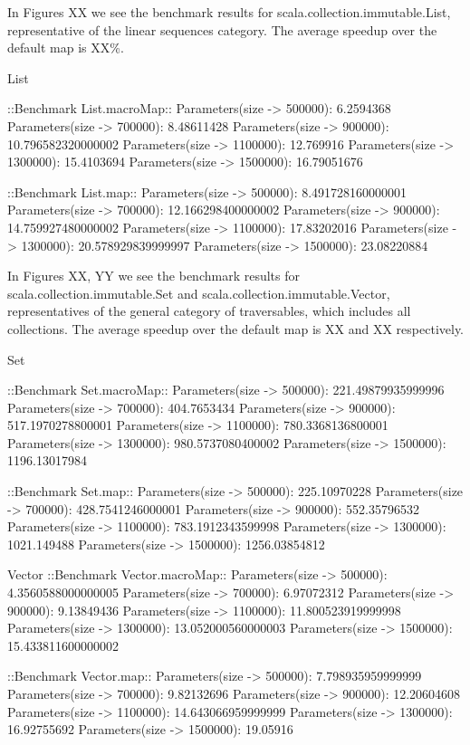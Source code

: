 In Figures XX we see the benchmark results for scala.collection.immutable.List,
representative of the linear sequences category. The average speedup over the
default map is XX\%.

List

::Benchmark List.macroMap::
Parameters(size -> 500000): 6.2594368
Parameters(size -> 700000): 8.48611428
Parameters(size -> 900000): 10.796582320000002
Parameters(size -> 1100000): 12.769916
Parameters(size -> 1300000): 15.4103694
Parameters(size -> 1500000): 16.79051676

::Benchmark List.map::
Parameters(size -> 500000): 8.491728160000001
Parameters(size -> 700000): 12.166298400000002
Parameters(size -> 900000): 14.759927480000002
Parameters(size -> 1100000): 17.83202016
Parameters(size -> 1300000): 20.578929839999997
Parameters(size -> 1500000): 23.08220884


In Figures XX, YY we see the benchmark results for
scala.collection.immutable.Set and scala.collection.immutable.Vector,
representatives of the general category of traversables, which includes all
collections. The average speedup over the default map is XX and XX respectively.

Set

::Benchmark Set.macroMap::
Parameters(size -> 500000): 221.49879935999996
Parameters(size -> 700000): 404.7653434
Parameters(size -> 900000): 517.1970278800001
Parameters(size -> 1100000): 780.3368136800001
Parameters(size -> 1300000): 980.5737080400002
Parameters(size -> 1500000): 1196.13017984

::Benchmark Set.map::
Parameters(size -> 500000): 225.10970228
Parameters(size -> 700000): 428.7541246000001
Parameters(size -> 900000): 552.35796532
Parameters(size -> 1100000): 783.1912343599998
Parameters(size -> 1300000): 1021.149488
Parameters(size -> 1500000): 1256.03854812


Vector
::Benchmark Vector.macroMap::
Parameters(size -> 500000): 4.3560588000000005
Parameters(size -> 700000): 6.97072312
Parameters(size -> 900000): 9.13849436
Parameters(size -> 1100000): 11.800523919999998
Parameters(size -> 1300000): 13.052000560000003
Parameters(size -> 1500000): 15.433811600000002

::Benchmark Vector.map::
Parameters(size -> 500000): 7.798935959999999
Parameters(size -> 700000): 9.82132696
Parameters(size -> 900000): 12.20604608
Parameters(size -> 1100000): 14.643066959999999
Parameters(size -> 1300000): 16.92755692
Parameters(size -> 1500000): 19.05916

